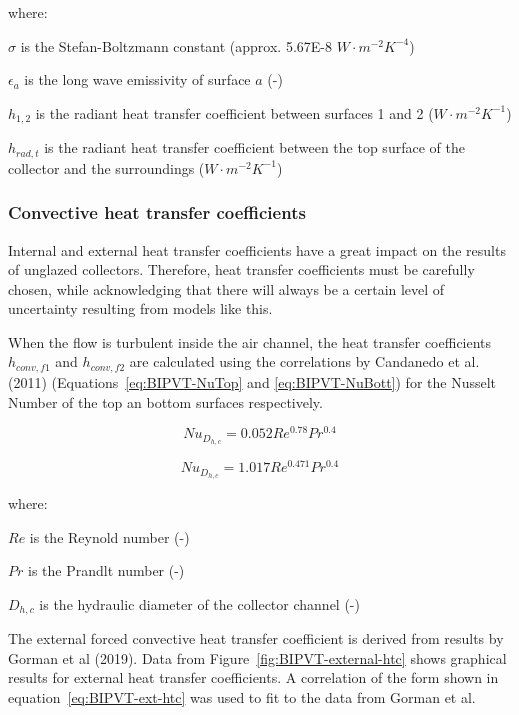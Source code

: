where:

\(\sigma\) is the Stefan-Boltzmann constant (approx. 5.67E-8 \(W\cdot m^{−2}K^{−4}\))

\(\epsilon_{a}\) is the long wave emissivity of surface \(a\) (-)

\(h_{1,2}\) is the radiant heat transfer coefficient between surfaces 1 and 2 (\(W\cdot m^{−2}K^{−1}\))

\(h_{rad,t}\) is the radiant heat transfer coefficient between the top surface of the collector and the surroundings (\(W\cdot m^{−2}K^{−1}\))

\subsubsection{Convective heat transfer coefficients}\label{BIPVT-htc-conv}

Internal and external heat transfer coefficients have a great impact on the results of unglazed collectors. Therefore, heat transfer coefficients must be carefully chosen, while acknowledging that there will always be a certain level of uncertainty resulting from models like this.

When the flow is turbulent inside the air channel, the heat transfer coefficients \(h_{conv,f1}\) and \(h_{conv,f2}\) are calculated using the correlations by Candanedo et al. (2011) (Equations~\ref{eq:BIPVT-NuTop} and \ref{eq:BIPVT-NuBott}) for the Nusselt Number of the top an bottom surfaces respectively.

\begin{equation}
Nu_{D_{h,c}}=0.052Re^{0.78}Pr^{0.4}
\label{eq:BIPVT-NuTop}
\end{equation}

\begin{equation}
Nu_{D_{h,c}}=1.017Re^{0.471}Pr^{0.4}
\label{eq:BIPVT-NuBott}
\end{equation}

where:

\(Re\) is the Reynold number (-)

\(Pr\) is the Prandlt number (-)

\(D_{h,c}\) is the hydraulic diameter of the collector channel (-)

The external forced convective heat transfer coefficient is derived from results by Gorman et al (2019). Data from Figure~\ref{fig:BIPVT-external-htc}  shows graphical results for external heat transfer coefficients. A correlation of the form shown in equation~\ref{eq:BIPVT-ext-htc} was used to fit to the data from Gorman et al.

